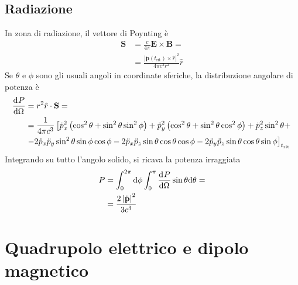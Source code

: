 \documentclass[a4paper,11pt]{article}
\renewcommand{\d}{\mathrm{d}}
\renewcommand{\vec}[1]{\mathbf{#1}}
\renewcommand{\t}{t_{\mathrm{rit}}}
\begin{document}
\subsection{Radiazione}
In zona di radiazione, il vettore di Poynting è
\begin{align*}
	\vec{S}&=\frac{c}{4\pi}\vec{E}\times\vec{B}=\\&=\frac{\left|\ddot{\vec{p}}(\t)\times\hat{r}\right|^2}{4\pi c^3r^2}\hat{r}
\end{align*}
Se $\theta$ e $\phi$ sono gli usuali angoli in coordinate sferiche, la distribuzione angolare di potenza è
\begin{align*}\der{P}{\Omega}&=r^2\hat{r}\cdot\vec{S}=\\&=\frac{1}{4\pi c^3}\left[\ddot{p}_x^2\left(\cos^2\theta+\sin^2\theta\sin^2\phi\right)+\ddot{p}_y^2\left(\cos^2\theta+\sin^2\theta\cos^2\phi\right)+\ddot{p}_z^2\sin^2\theta+\right.\\&\left.-2\ddot{p}_x\ddot{p}_y\sin^2\theta\sin\phi\cos\phi-2\ddot{p}_x\ddot{p}_z\sin\theta\cos\theta\cos\phi-2\ddot{p}_y\ddot{p}_z\sin\theta\cos\theta\sin\phi\right]_{\t}\end{align*}
Integrando su tutto l'angolo solido, si ricava la potenza irraggiata
\begin{align*}
	P&=\int_{0}^{2\pi}\d\phi\int_{0}^{\pi}\der{P}{\Omega}\sin\theta\d\theta=\\&=\frac{2\left|\ddot{\vec{p}}\right|^2}{3c^3}
\end{align*}
\vspace{10 mm}
\section{Quadrupolo elettrico e dipolo magnetico}
\end{document}
